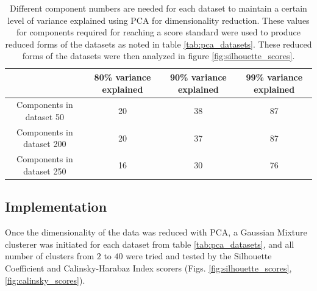 \documentclass[journal,12pt,onecolumn,draftclsnofoot]{IEEEtran}  %
\begin{document}
\begin{table}[H]
\centering
\caption{Different component numbers are needed for each dataset to maintain a certain level of variance explained using PCA for dimensionality reduction. These values for components required for reaching a score standard were used to produce reduced forms of the datasets as noted in table \ref{tab:pca_datasets}. These reduced forms of the datasets were then analyzed in figure \ref{fig:silhouette_scores}.}
\label{tab:components_needed_for_variance}
\begin{tabular}{|c|c|c|c|}
\hline
 &  80\% variance explained &  90\% variance explained & 99\% variance explained \\ \hline
 
 Components in dataset 50 & 20 &  38&  87  \\ \hline
 Components in dataset 200 & 20 &  37&  87\\ \hline
 Components in dataset 250 & 16 &  30&  76  \\ \hline
\end{tabular}
\end{table}





\subsection{Implementation}
Once the dimensionality of the data was reduced with PCA, a Gaussian Mixture clusterer was initiated for each dataset from table \ref{tab:pca_datasets}, and all number of clusters from $2$ to $40$ were tried and tested by the Silhouette Coefficient and Calinsky-Harabaz Index scorers (Figs. \ref{fig:silhouette_scores}, \ref{fig:calinsky_scores}).
\end{document}
